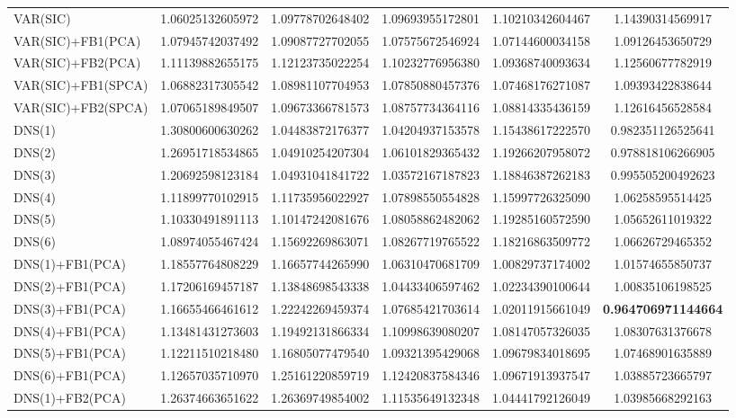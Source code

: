 \begin{table}[h]
\begin{adjustbox}{totalheight=\baselineskip}
\begin{tabular}{lSSSSS}
VAR(SIC) & 1.06025132605972 & 1.09778702648402 & 1.09693955172801 & 1.10210342604467 & 1.14390314569917 \\ 
VAR(SIC)+FB1(PCA) & 1.07945742037492 & 1.09087727702055 & 1.07575672546924 & 1.07144600034158 & 1.09126453650729 \\ 
VAR(SIC)+FB2(PCA) & 1.11139882655175 & 1.12123735022254 & 1.10232776956380 & 1.09368740093634 & 1.12560677782919 \\ 
VAR(SIC)+FB1(SPCA) & 1.06882317305542 & 1.08981107704953 & 1.07850880457376 & 1.07468176271087 & 1.09393422838644 \\ 
VAR(SIC)+FB2(SPCA) & 1.07065189849507 & 1.09673366781573 & 1.08757734364116 & 1.08814335436159 & 1.12616456528584 \\ 
DNS(1) & 1.30800600630262 & 1.04483872176377 & 1.04204937153578 & 1.15438617222570 & 0.982351126525641 \\ 
DNS(2) & 1.26951718534865 & 1.04910254207304 & 1.06101829365432 & 1.19266207958072 & 0.978818106266905 \\ 
DNS(3) & 1.20692598123184 & 1.04931041841722 & 1.03572167187823 & 1.18846387262183 & 0.995505200492623 \\ 
DNS(4) & 1.11899770102915 & 1.11735956022927 & 1.07898550554828 & 1.15997726325090 & 1.06258595514425 \\ 
DNS(5) & 1.10330491891113 & 1.10147242081676 & 1.08058862482062 & 1.19285160572590 & 1.05652611019322 \\ 
DNS(6) & 1.08974055467424 & 1.15692269863071 & 1.08267719765522 & 1.18216863509772 & 1.06626729465352 \\ 
DNS(1)+FB1(PCA) & 1.18557764808229 & 1.16657744265990 & 1.06310470681709 & 1.00829737174002 & 1.01574655850737 \\ 
DNS(2)+FB1(PCA) & 1.17206169457187 & 1.13848698543338 & 1.04433406597462 & 1.02234390100644 & 1.00835106198525 \\ 
DNS(3)+FB1(PCA) & 1.16655466461612 & 1.22242269459374 & 1.07685421703614 & 1.02011915661049 & \bfseries 0.964706971144664 \\ 
DNS(4)+FB1(PCA) & 1.13481431273603 & 1.19492131866334 & 1.10998639080207 & 1.08147057326035 & 1.08307631376678 \\ 
DNS(5)+FB1(PCA) & 1.12211510218480 & 1.16805077479540 & 1.09321395429068 & 1.09679834018695 & 1.07468901635889 \\ 
DNS(6)+FB1(PCA) & 1.12657035710970 & 1.25161220859719 & 1.12420837584346 & 1.09671913937547 & 1.03885723665797 \\ 
DNS(1)+FB2(PCA) & 1.26374663651622 & 1.26369749854002 & 1.11535649132348 & 1.04441792126049 & 1.03985668292163 \\ 

\end{tabular}
\end{adjustbox}
\end{table}
